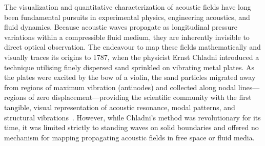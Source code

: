 The visualization and quantitative characterization of acoustic fields have
long been fundamental pursuits in experimental physics, engineering acoustics,
and fluid dynamics.
Because acoustic waves propagate as longitudinal pressure variations within a
compressible fluid medium, they are inherently invisible to direct optical
observation.
The endeavour to map these fields mathematically and visually traces its
origins to 1787, when the physicist Ernst Chladni introduced a technique
utilising finely dispersed sand sprinkled on vibrating metal plates.
As the plates were excited by the bow of a violin, the sand particles migrated
away from regions of maximum vibration (antinodes) and collected along nodal
lines---regions of zero displacement---providing the scientific community with
the first tangible, visual representation of acoustic resonance, modal
patterns, and structural vibrations~\cite{FernandezComesana2014}.
However, while Chladni's method was revolutionary for its time, it was limited
strictly to standing waves on solid boundaries and offered no mechanism for
mapping propagating acoustic fields in free space or fluid media.

